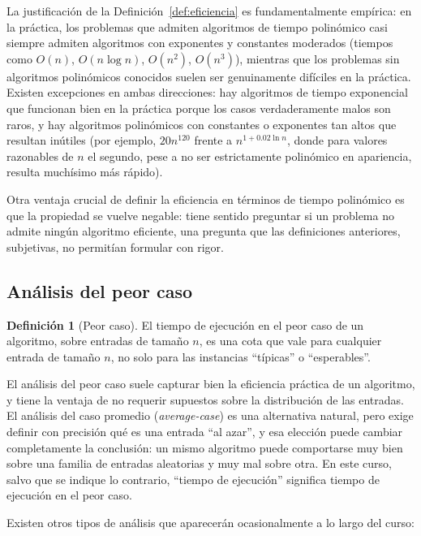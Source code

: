 \documentclass[12pt, spanish, oneside, openany]{book}
\theoremstyle{uprightplain}
\theoremstyle{definition}
\newtheorem{definicion}[teorema]{Definición}
\theoremstyle{remark}
\theoremstyle{definition}
\begin{document}
La justificación de la Definición~\ref{def:eficiencia} es fundamentalmente empírica: en la práctica, los problemas que admiten algoritmos de tiempo polinómico casi siempre admiten algoritmos con exponentes y constantes moderados (tiempos como $O(n)$, $O(n\log n)$, $O(n^2)$, $O(n^3)$), mientras que los problemas sin algoritmos polinómicos conocidos suelen ser genuinamente difíciles en la práctica. Existen excepciones en ambas direcciones: hay algoritmos de tiempo exponencial que funcionan bien en la práctica porque los casos verdaderamente malos son raros, y hay algoritmos polinómicos con constantes o exponentes tan altos que resultan inútiles (por ejemplo, $20n^{120}$ frente a $n^{1+0.02\ln n}$, donde para valores razonables de $n$ el segundo, pese a no ser estrictamente polinómico en apariencia, resulta muchísimo más rápido).

Otra ventaja crucial de definir la eficiencia en términos de tiempo polinómico es que la propiedad se vuelve negable: tiene sentido preguntar si un problema no admite ningún algoritmo eficiente, una pregunta que las definiciones anteriores, subjetivas, no permitían formular con rigor.


\subsection{Análisis del peor caso}

\begin{definicion}[Peor caso]
\label{def:peor-caso}
El tiempo de ejecución en el peor caso de un algoritmo, sobre entradas de tamaño $n$, es una cota que vale para cualquier entrada de tamaño $n$, no solo para las instancias ``típicas'' o ``esperables''.
\end{definicion}

El análisis del peor caso suele capturar bien la eficiencia práctica de un algoritmo, y tiene la ventaja de no requerir supuestos sobre la distribución de las entradas. El análisis del caso promedio (\emph{average-case}) es una alternativa natural, pero exige definir con precisión qué es una entrada ``al azar'', y esa elección puede cambiar completamente la conclusión: un mismo algoritmo puede comportarse muy bien sobre una familia de entradas aleatorias y muy mal sobre otra. En este curso, salvo que se indique lo contrario, ``tiempo de ejecución'' significa tiempo de ejecución en el peor caso.

Existen otros tipos de análisis que aparecerán ocasionalmente a lo largo del curso:
\end{document}
